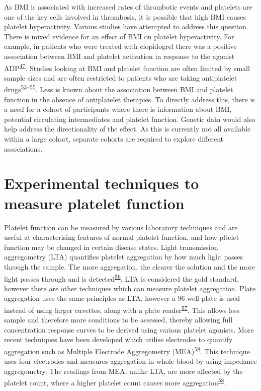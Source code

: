 \documentclass[11pt,twoside]{bristolthesis}
\begin{document}
As BMI is associated with increased rates of thrombotic events and platelets are one of the key cells involved in thrombosis, it is possible that high BMI causes platelet hyperactivity. Various studies have attempted to address this question. There is mixed evidence for an effect of BMI on platelet hyperactivity. For example, in patients who were treated with clopidogrel there was a positive association between BMI and platelet activation in response to the agonist ADP\textsuperscript{\protect\hyperlink{ref-Nardin2015}{47}}. Studies looking at BMI and platelet function are often limited by small sample sizes and are often restricted to patients who are taking antiplatelet drugs\textsuperscript{\protect\hyperlink{ref-Deharo2014}{53}--\protect\hyperlink{ref-Pankert2014}{55}}. Less is known about the association between BMI and platelet function in the absence of antiplatelet therapies. To directly address this, there is a need for a cohort of participants where there is information about BMI, potential circulating intermediates and platelet function. Genetic data would also help address the directionality of the effect. As this is currently not all available within a large cohort, separate cohorts are required to explore different associations.

\hypertarget{platelet-function-techniques}{%
\section{Experimental techniques to measure platelet function}\label{platelet-function-techniques}}

Platelet function can be measured by various laboratory techniques and are useful at characterising features of normal platelet function, and how pltelet function may be changed in certain disease states. Light transmission aggregometry (LTA) quantifies platelet aggregation by how much light passes through the sample. The more aggregation, the clearer the solution and the more light passes through and is detected\textsuperscript{\protect\hyperlink{ref-Born1962}{56}}. LTA is considered the gold standard, however there are other techniques which can measure platelet aggregation. Plate aggregation uses the same principles as LTA, however a 96 well plate is used instead of using larger cuvettes, along with a plate reader\textsuperscript{\protect\hyperlink{ref-Chan2018}{57}}. This allows less sample and therefore more conditions to be assessed, thereby allowing full concentration response curves to be derived using various platelet agonists. More recent techniques have been developed which utilise electrodes to quantify aggregation such as Multiple Electrode Aggregometry (MEA)\textsuperscript{\protect\hyperlink{ref-Toth2006}{58}}. This technique uses four electrodes and measures aggregation in whole blood by using impedance aggregometry. The readings from MEA, unlike LTA, are more affected by the platelet count, where a higher platelet count causes more aggregation\textsuperscript{\protect\hyperlink{ref-Toth2006}{58}}.
\end{document}
